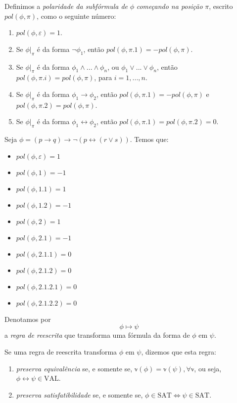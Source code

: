 \begin{definition}
    Definimos a \emph{polaridade da subfórmula de} $\phi$ \emph{começando na posição} $\pi$, escrito $pol(\phi,\pi)$, como o seguinte número:
    \begin{enumerate}
        \item $pol(\phi,\varepsilon) = 1$.
        \item Se $\phi|_\pi$ é da forma $\neg \phi_1$, então $pol(\phi,\pi.1) = -pol(\phi,\pi)$.
        \item Se $\phi|_\pi$ é da forma $\phi_1 \wedge ... \wedge \phi_n$, ou $\phi_1 \vee ... \vee \phi_n$, então $pol(\phi,\pi.i) = pol(\phi,\pi)$, para $i=1,...,n$.
        \item Se $\phi|_\pi$ é da forma $\phi_1 \rightarrow \phi_2$, então $pol(\phi,\pi.1) = -pol(\phi,\pi)$ e $pol(\phi,\pi.2) = pol(\phi,\pi)$.
        \item Se $\phi|_\pi$ é da forma $\phi_1 \leftrightarrow \phi_2$, então $pol(\phi,\pi.1) = pol(\phi,\pi.2) = 0$.
    \end{enumerate}
\end{definition}

\begin{example}
    Seja $\phi = (p \rightarrow q) \rightarrow \neg(p \leftrightarrow (r \vee s))$. Temos que:
    \begin{itemize}
        \item $pol(\phi,\varepsilon) = 1$
        \item $pol(\phi,1) = -1$
        \item $pol(\phi,1.1) = 1$
        \item $pol(\phi,1.2) = -1$
        \item $pol(\phi,2) = 1$
        \item $pol(\phi,2.1) = -1$
        \item $pol(\phi,2.1.1) = 0$
        \item $pol(\phi,2.1.2) = 0$
        \item $pol(\phi,2.1.2.1) = 0$
        \item $pol(\phi,2.1.2.2) = 0$
    \end{itemize}
\end{example}

\begin{definition}
	Denotamos por $$\phi \longmapsto \psi$$ a \emph{regra de reescrita} que transforma uma fórmula da forma de $\phi$ em $\psi$.
	
	Se uma regra de reescrita transforma $\phi$ em $\psi$, dizemos que esta regra:
	\begin{enumerate}
		\item \emph{preserva equivalência} se, e somente se, $\mathbb{v}(\phi) = \mathbb{v}(\psi), \forall \mathbb{v}$, ou seja, $\phi \leftrightarrow \psi \in \text{VAL}$.
		\item \emph{preserva satisfatibilidade} se, e somente se, $\phi \in \text{SAT} \iff \psi \in \text{SAT}$.
	\end{enumerate}
\end{definition}

